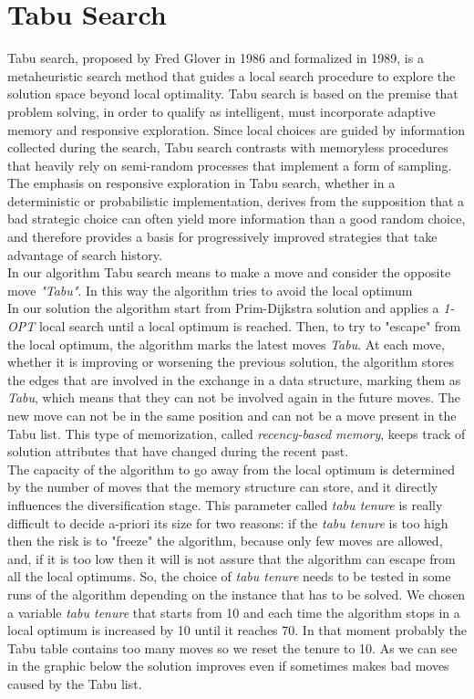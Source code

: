 \newpage
\section{Tabu Search}
Tabu search, proposed by Fred Glover in 1986 and formalized in 1989, is a metaheuristic search method that guides a local search procedure to explore the solution space beyond local optimality. Tabu search is based on the premise that problem solving, in order to qualify as intelligent, must incorporate adaptive memory and responsive exploration. Since local choices are guided by information collected during the search, Tabu search contrasts with memoryless procedures that heavily rely on semi-random processes that implement a form of sampling. The emphasis on responsive exploration in Tabu search, whether in a deterministic or probabilistic implementation, derives from the supposition that a bad strategic choice can often yield more information than a good random choice, and therefore provides a basis for progressively improved strategies that take advantage of search history.\\
In our algorithm Tabu search means to make a move and consider the opposite move \textit{"Tabu"}. In this way the algorithm tries to avoid the local optimum\\
In our solution the algorithm start from Prim-Dijkstra solution and applies a \textit{1-OPT} local search until a local optimum is reached. Then, to try to "escape" from the local optimum, the algorithm marks the latest moves \textit{Tabu}. At each move, whether it is improving or worsening the previous solution, the algorithm stores the edges that are involved in the exchange in a data structure, marking them as \textit{Tabu}, which means that they can not be involved again in the future moves. The new move can not be in the same position and can not be a move present in the Tabu list. This type of memorization, called \textit{recency-based memory}, keeps track of solution attributes that have changed during the recent past.\\
The capacity of the algorithm to go away from the local optimum is determined by the number of moves that the memory structure can store, and it directly influences the diversification stage. This parameter called \textit{tabu tenure} is really difficult to decide a-priori its size for two reasons: if the \textit{tabu tenure} is too high then the risk is to "freeze" the algorithm, because only few moves are allowed, and, if it is too low then it will is not assure that the algorithm can escape from all the local optimums. So, the choice of \textit{tabu tenure} needs to be tested in some runs of the algorithm depending on the instance that has to be solved. We chosen a variable \textit{tabu tenure} that starts from 10 and each time the algorithm stops in a local optimum is increased by 10 until it reaches 70. In that moment probably the Tabu table contains too many moves so we reset the tenure to 10. As we can see in the graphic below the solution improves even if sometimes makes bad moves caused by the Tabu list.

